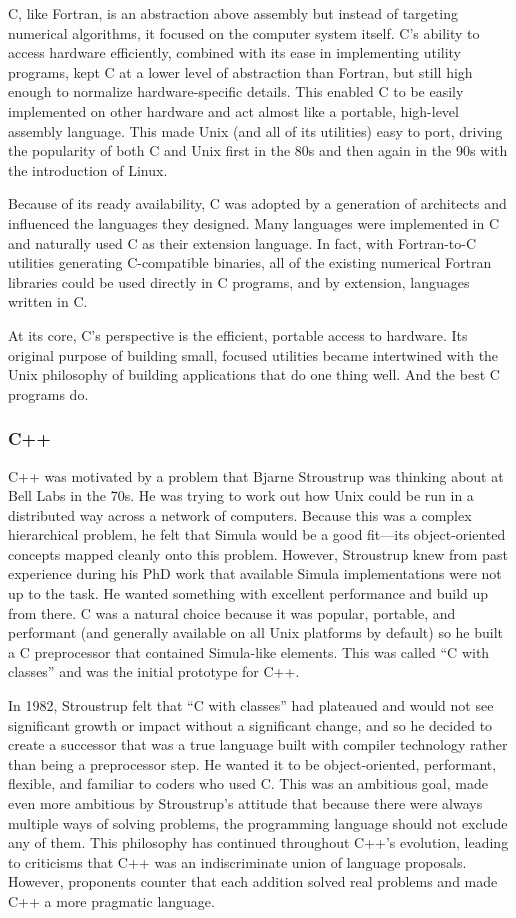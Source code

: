 C, like Fortran, is an abstraction above assembly but instead of targeting
numerical algorithms, it focused on the computer system itself. C's ability to
access hardware efficiently, combined with its ease in implementing utility
programs, kept C at a lower level of abstraction than Fortran, but still high
enough to normalize hardware-specific details. This enabled C to be easily
implemented on other hardware and act almost like a portable, high-level
assembly language. This made Unix (and all of its utilities) easy to port,
driving the popularity of both C and Unix first in the 80s and then again in
the 90s with the introduction of Linux.

Because of its ready availability, C was adopted by a generation of architects
and influenced the languages they designed. Many languages were implemented in
C and naturally used C as their extension language. In fact, with Fortran-to-C
utilities generating C-compatible binaries, all of the existing numerical
Fortran libraries could be used directly in C programs, and by extension,
languages written in C.

At its core, C's perspective is the efficient, portable access to hardware. Its
original purpose of building small, focused utilities became intertwined with
the Unix philosophy of building applications that do one thing well. And the
best C programs do.

\subsubsection{C++}

C++ was motivated by a problem that Bjarne Stroustrup was thinking about at
Bell Labs in the 70s. He was trying to work out how Unix could be run in a
distributed way across a network of computers. Because this was a complex
hierarchical problem, he felt that Simula would be a good fit---its
object-oriented concepts mapped cleanly onto this problem. However, Stroustrup
knew from past experience during his PhD work that available Simula
implementations were not up to the task. He wanted something with excellent
performance and build up from there. C was a natural choice because it was
popular, portable, and performant (and generally available on all Unix
platforms by default) so he built a C preprocessor that contained Simula-like
elements. This was called ``C with classes'' and was the initial prototype for
C++.

In 1982, Stroustrup felt that ``C with classes'' had plateaued and would not see
significant growth or impact without a significant change, and so he decided to
create a successor that was a true language built with compiler technology
rather than being a preprocessor step. He wanted it to be object-oriented,
performant, flexible, and familiar to coders who used C. This was an ambitious
goal, made even more ambitious by Stroustrup's attitude that because there were
always multiple ways of solving problems, the programming language should not
exclude any of them. This philosophy has continued throughout C++'s evolution,
leading to criticisms that C++ was an indiscriminate union of language
proposals. However, proponents counter that each addition solved real problems
and made C++ a more pragmatic language.

